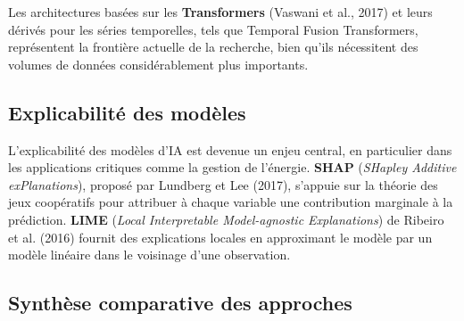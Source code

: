 \documentclass[12pt,a4paper]{article}
\begin{document}
Les architectures basées sur les \textbf{Transformers} (Vaswani et al., 2017) et leurs dérivés pour les séries temporelles, tels que Temporal Fusion Transformers, représentent la frontière actuelle de la recherche, bien qu'ils nécessitent des volumes de données considérablement plus importants.

\subsection{Explicabilité des modèles}
L'explicabilité des modèles d'IA est devenue un enjeu central, en particulier dans les applications critiques comme la gestion de l'énergie. \textbf{SHAP} (\textit{SHapley Additive exPlanations}), proposé par Lundberg et Lee (2017), s'appuie sur la théorie des jeux coopératifs pour attribuer à chaque variable une contribution marginale à la prédiction. \textbf{LIME} (\textit{Local Interpretable Model-agnostic Explanations}) de Ribeiro et al. (2016) fournit des explications locales en approximant le modèle par un modèle linéaire dans le voisinage d'une observation.

\subsection{Synthèse comparative des approches}

\begin{table}[h]
\centering
{}
\caption{Synthèse comparative des approches}
\end{table}
\end{document}

